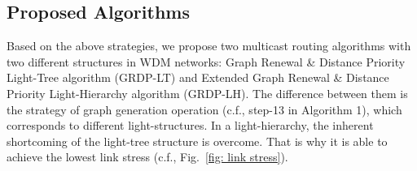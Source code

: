 \documentclass[conference]{IEEEtran}
\begin{document}
\subsection{Proposed Algorithms}
\label{subsec: Proposed Algorithms}
Based on the above strategies, we propose two multicast routing algorithms with two different structures in WDM networks: Graph Renewal \& Distance Priority Light-Tree algorithm (GRDP-LT) and Extended Graph Renewal \& Distance Priority Light-Hierarchy algorithm (GRDP-LH). The difference between them is the strategy of graph generation operation (c.f., step-13 in Algorithm 1), which corresponds to different light-structures. In a light-hierarchy, the inherent shortcoming of the light-tree structure is overcome. That is why it is able to achieve the lowest link stress (c.f., Fig.~\ref{fig: link stress}).
\end{document}
